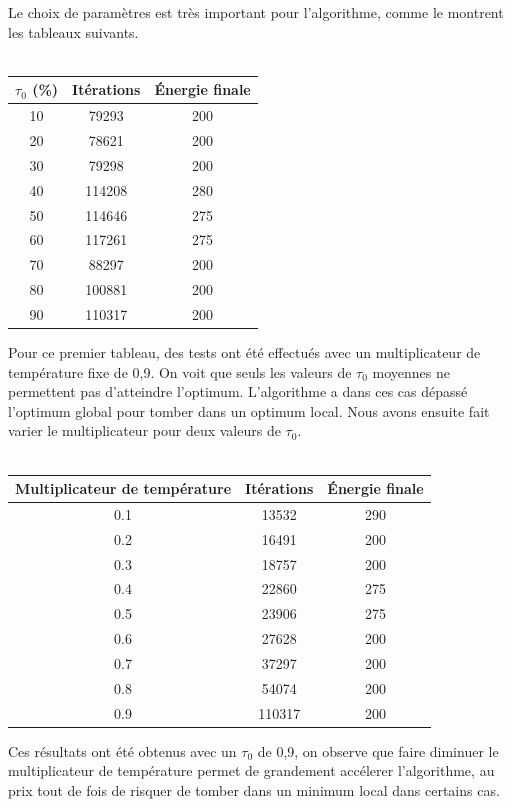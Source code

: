 \documentclass{report}
\begin{document}
Le choix de param\`etres est tr\`es important pour l'algorithme, comme le montrent
les tableaux suivants.\\\\

\begin{tabular}{|c|c|c|}
 \hline
 $\tau_{0}$ (\%) & It\'erations & \'Energie finale \\
 \hline
 \hline
 10 & 79293  & 200 \\
 \hline
 20 & 78621  & 200 \\
 \hline
 30 & 79298  & 200 \\
 \hline
 40 & 114208 & 280 \\
 \hline
 50 & 114646 & 275 \\
 \hline
 60 & 117261 & 275 \\
 \hline
 70 & 88297  & 200 \\
 \hline
 80 & 100881 & 200 \\
 \hline
 90 & 110317 & 200 \\
 \hline
\end{tabular}


Pour ce premier tableau, des tests ont \'et\'e effectu\'es avec un multiplicateur
de temp\'erature fixe de 0,9. On voit que seuls les valeurs de  $\tau_{0}$ moyennes
ne permettent pas d'atteindre l'optimum. L'algorithme a dans ces cas d\'epass\'e
l'optimum global pour tomber dans un optimum local. Nous avons ensuite fait varier
le multiplicateur pour deux valeurs de  $\tau_{0}$.\\\\

\begin{tabular}{|c|c|c|}
 \hline
 Multiplicateur de temp\'erature & It\'erations & \'Energie finale \\
 \hline
 \hline
0.1 & 13532  & 290 \\
 \hline
0.2  & 16491 & 200 \\
 \hline
0.3  & 18757  & 200 \\
 \hline
0.4  & 22860  & 275 \\
 \hline
0.5  & 23906  & 275 \\
 \hline
0.6  & 27628  & 200 \\
 \hline
0.7  & 37297  & 200 \\
 \hline
0.8  & 54074  & 200 \\
 \hline
0.9  & 110317  & 200 \\
 \hline
\end{tabular}


Ces r\'esultats ont \'et\'e obtenus avec un  $\tau_{0}$ de 0,9, on observe que
faire diminuer le multiplicateur de temp\'erature permet de grandement acc\'elerer
l'algorithme, au prix tout de fois de risquer de tomber dans un minimum local
dans certains cas.\\\\
\end{document}
